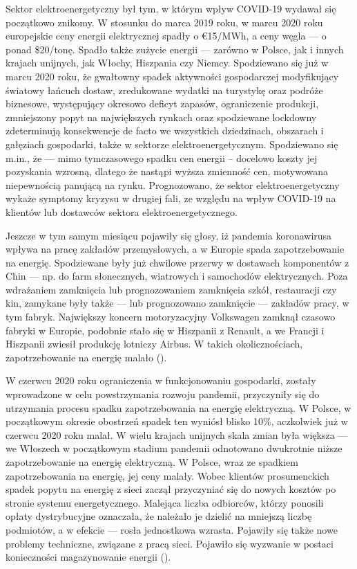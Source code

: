\documentclass[polish, twoside, 12pt, a4paper]{article}
\theoremstyle{definition}
\theoremstyle{plain}
\theoremstyle{remark}
\begin{document}
Sektor elektroenergetyczny był tym, w którym wpływ COVID-19 wydawał się początkowo znikomy. W stosunku do marca 2019 roku, w marcu 2020 roku europejskie ceny energii elektrycznej spadły o €15/MWh, a ceny węgla --- o ponad \$20/tonę. Spadło także zużycie energii --- zarówno w Polsce, jak i innych krajach unijnych, jak Włochy, Hiszpania czy Niemcy. Spodziewano się już w marcu 2020 roku, że gwałtowny spadek aktywności gospodarczej modyfikujący światowy łańcuch dostaw, zredukowane wydatki na turystykę oraz podróże biznesowe, występujący okresowo deficyt zapasów, ograniczenie produkcji, zmniejszony popyt na największych rynkach oraz spodziewane lockdowny zdeterminują konsekwencje de facto we wszystkich dziedzinach, obszarach i gałęziach gospodarki, także w sektorze elektroenergetycznym. Spodziewano się m.in., że --- mimo tymczasowego spadku cen energii – docelowo koszty jej pozyskania wzrosną, dlatego że nastąpi wyższa zmienność cen, motywowana niepewnością panującą na rynku. Prognozowano, że sektor elektroenergetyczny wykaże symptomy kryzysu w drugiej fali, ze względu na wpływ COVID-19 na klientów lub dostawców sektora elektroenergetycznego. %

Jeszcze w tym samym miesiącu pojawiły się głosy, iż pandemia koronawirusa wpływa na pracę zakładów przemysłowych, a w Europie spada zapotrzebowanie na energię. Spodziewane były już chwilowe przerwy w dostawach komponentów z Chin --- np. do farm słonecznych, wiatrowych i samochodów elektrycznych. Poza wdrażaniem zamknięcia lub prognozowaniem zamknięcia szkół, restauracji czy kin, zamykane były także --- lub prognozowano zamknięcie --- zakładów pracy, w tym fabryk. Największy koncern motoryzacyjny Volkswagen zamknął czasowo fabryki w Europie, podobnie stało się w Hiszpanii z Renault, a we Francji i Hiszpanii zwiesił produkcję lotniczy Airbus. W takich okolicznościach, zapotrzebowanie na energię malało (\cite{wysokienapiecie2023}). 

W czerwcu 2020 roku ograniczenia w funkcjonowaniu gospodarki, zostały wprowadzone w celu powstrzymania rozwoju pandemii, przyczyniły się do utrzymania procesu spadku zapotrzebowania na energię elektryczną. W Polsce, w początkowym okresie obostrzeń spadek ten wyniósł blisko 10\%, aczkolwiek już w czerwcu 2020 roku malał. W wielu krajach unijnych skala zmian była większa --- we Włoszech w początkowym stadium pandemii odnotowano dwukrotnie niższe zapotrzebowanie na energię elektryczną. W Polsce, wraz ze spadkiem zapotrzebowania na energię, jej ceny malały. Wobec klientów prosumenckich spadek popytu na energię z sieci zaczął przyczyniać się do nowych kosztów po stronie systemu energetycznego. Malejąca liczba odbiorców, którzy ponosili opłaty dystrybucyjne oznaczała, że należało je dzielić na mniejszą liczbę podmiotów, a w efekcie --- rosła jednostkowa wzrasta. Pojawiły się także nowe problemy techniczne, związane z pracą sieci. Pojawiło się wyzwanie w postaci konieczności magazynowanie energii (\cite{ure2023}).
\end{document}
